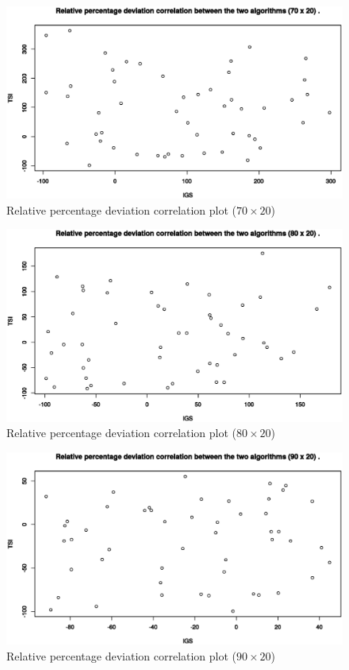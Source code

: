 \begin{figure}[H]
	\centering
	\includegraphics[width=\textwidth]{fig/corr/70x20}
	\caption{Relative percentage deviation correlation plot ($70 \times 20$)}
\end{figure}

\begin{figure}[H]
	\centering
	\includegraphics[width=\textwidth]{fig/corr/80x20}
	\caption{Relative percentage deviation correlation plot ($80 \times 20$)}
\end{figure}

\begin{figure}[H]
	\centering
	\includegraphics[width=\textwidth]{fig/corr/90x20}
	\caption{Relative percentage deviation correlation plot ($90 \times 20$)}
\end{figure}